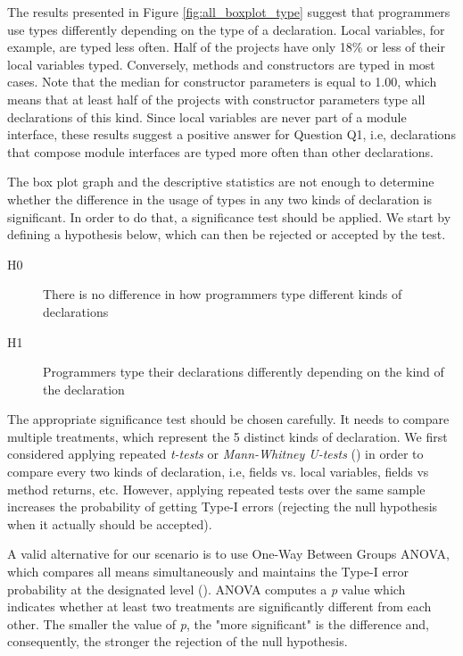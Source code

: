 \documentclass[msc]{ppgccufmg}
\begin{document}
The results presented in Figure \ref{fig:all_boxplot_type} suggest that programmers use types differently depending on the type of a declaration.
Local variables, for example, are typed less often.
Half of the projects have only 18\% or less of their local variables typed.
Conversely, methods and constructors are typed in most cases.
Note that the median for constructor parameters is equal to 1.00, which means that at least half of the projects with constructor parameters type all declarations of this kind.
Since local variables are never part of a module interface, these results suggest a positive answer for Question Q1, i.e, declarations that compose module interfaces are typed more often than other declarations.

The box plot graph and the descriptive statistics are not enough to determine whether the difference in the usage of types in any two kinds of declaration is significant.
In order to do that, a significance test should be applied. 
We start by defining a hypothesis below, which can then be rejected or accepted by the test.

\begin{description}
\item[H0] There is no difference in how programmers type different kinds of declarations
\item[H1] Programmers type their declarations differently depending on the kind of the declaration
\end{description}

The appropriate significance test should be chosen carefully.
It needs to compare multiple treatments, which represent the 5 distinct kinds of declaration.
We first considered applying repeated \emph{t-tests} or \emph{Mann-Whitney U-tests} (\cite{Wohlin2012}) in order to compare every two kinds of declaration, i.e, fields vs. local variables, fields vs method returns, etc.
However, applying repeated tests over the same sample increases the probability of getting Type-I errors (rejecting the null hypothesis when it actually should be accepted).

A valid alternative for our scenario is to use One-Way Between Groups ANOVA, which compares all means simultaneously and maintains the Type-I error probability at the designated level (\cite{Wohlin2012}).
ANOVA computes a \emph{p} value which indicates whether at least two treatments are significantly different from each other.
The smaller the value of \emph{p}, the "more significant" is the difference and, consequently, the stronger the rejection of the null hypothesis.
\end{document}
